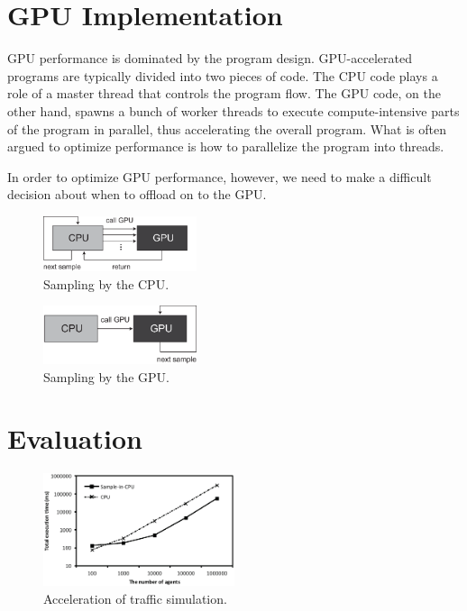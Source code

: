 \documentclass[times, 10pt, twocolumn]{article}
\begin{document}
\section{GPU Implementation}
\label{sec:gpu_implementations}

GPU performance is dominated by the program design.
GPU-accelerated programs are typically divided into two pieces of code.
The CPU code plays a role of a master thread that controls the program
flow.
The GPU code, on the other hand, spawns a bunch of worker threads to
execute compute-intensive parts of the program in parallel, thus
accelerating the overall program.
What is often argued to optimize performance is how to parallelize the
program into threads.

In order to optimize GPU performance, however, we need to make a
difficult decision about when to offload on to the GPU.

\begin{figure}[t]
\centering
\includegraphics[width=0.4\textwidth]{eps/sample-in-cpu.eps}
\caption{Sampling by the CPU.}
\label{fig:sample-in-cpu}
\end{figure}

\begin{figure}[t]
\centering
\includegraphics[width=0.4\textwidth]{eps/sample-in-gpu.eps}
\caption{Sampling by the GPU.}
\label{fig:sample-in-cpu}
\end{figure}


\section{Evaluation}
\label{sec:evaluation}

\begin{figure}[t]
\centering
\includegraphics[width=0.5\textwidth]{eps/eval_accel.eps}
\caption{Acceleration of traffic simulation.}
\label{fig:eval_accel}
\end{figure}
\end{document}
